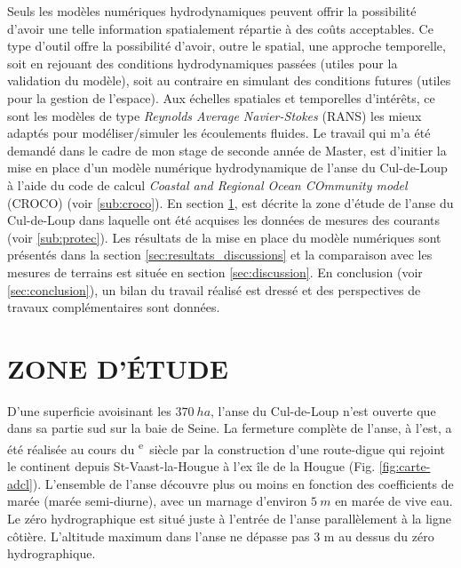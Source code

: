 \documentclass[10pt,a4paper,titlepage]{article}
\def\siecle#1{\textsc{\romannumeral #1}\textsuperscript{e}~siècle}
\begin{document}
    Seuls les modèles numériques hydrodynamiques peuvent offrir la possibilité d'avoir une telle information spatialement répartie à des coûts acceptables. Ce type d'outil offre la possibilité d'avoir, outre le spatial, une approche temporelle, soit en rejouant des conditions hydrodynamiques passées (utiles pour la validation du modèle), soit au contraire en simulant des conditions futures (utiles pour la gestion de l'espace). Aux échelles spatiales et temporelles d'intérêts, ce sont les modèles de type \textit{Reynolds Average Navier-Stokes} (RANS) les mieux adaptés pour modéliser/simuler les écoulements fluides.
    Le travail qui m'a été demandé dans le cadre de mon stage de seconde année de Master, est d'initier la mise en place d'un modèle numérique hydrodynamique de l'anse du Cul-de-Loup à l'aide du code de calcul \textit{Coastal and Regional Ocean COmmunity model} (CROCO) (voir \ref{sub:croco}). En section \ref{sec:adcl}, est décrite la zone d'étude de l'anse du Cul-de-Loup dans laquelle ont été acquises les données de mesures des courants (voir \ref{sub:protec}). Les résultats de la mise en place du modèle numériques sont présentés dans la section \ref{sec:resultats_discussions} et la comparaison avec les mesures de terrains est située en section \ref{sec:discussion}. En conclusion (voir \ref{sec:conclusion}), un bilan du travail réalisé est dressé et des perspectives de travaux complémentaires sont données.

    \newpage

    \section{ZONE D'ÉTUDE}
    \label{sec:adcl}

    D'une superficie avoisinant les $370~ha$, l'anse du Cul-de-Loup n'est ouverte que dans sa partie sud sur la baie de Seine. La fermeture complète de l'anse, à l'est, a été réalisée au cours du \siecle{17} par la construction d'une route-digue qui rejoint le continent depuis St-Vaast-la-Hougue à l'ex île de la Hougue (Fig. \ref{fig:carte-adcl}). L'ensemble de l'anse découvre plus ou moins en fonction des coefficients de marée (marée semi-diurne), avec un marnage d'environ $5~m$ en marée de vive eau. Le zéro hydrographique est situé juste à l'entrée de l'anse parallèlement à la ligne côtière. L'altitude maximum dans l'anse ne dépasse pas 3 m au dessus du zéro hydrographique.
\end{document}
